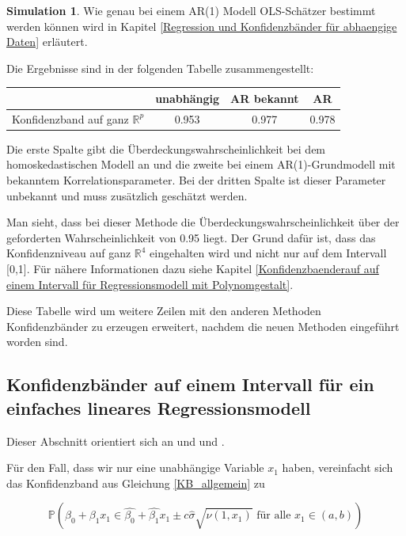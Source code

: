 \documentclass[12pt,a4paper]{article}
\theoremstyle{definition}
\theoremstyle{definition}
\theoremstyle{definition}
\newtheorem{Simulation}[Definition]{Simulation}
\theoremstyle{definition}
\newcommand{\UeberRR}{0.953}
\newcommand{\UeberARbekanntR}{0.977}
\newcommand{\UeberARR}{0.978}
\begin{document}
\begin{Simulation}
Wie genau bei einem AR(1) Modell OLS-Schätzer bestimmt werden können wird in Kapitel \ref{Regression und Konfidenzbänder für abhaengige Daten} erläutert.

Die Ergebnisse sind in der folgenden Tabelle zusammengestellt:

\begin{center}
\begin{tabular}{|c|c|c|c|}
\hline 
 & unabhängig & AR bekannt & AR \\ 
\hline 
Konfidenzband auf ganz $\mathbb{R}^{p}$		 & \UeberRR		  & \UeberARbekanntR & \UeberARR \\ 
\hline 
\end{tabular} 
\end{center}

Die erste Spalte gibt die Überdeckungswahrscheinlichkeit bei dem homoskedastischen Modell an und die zweite bei einem AR(1)-Grundmodell mit bekanntem Korrelationsparameter. Bei der dritten Spalte ist dieser Parameter unbekannt und muss zusätzlich geschätzt werden. 

Man sieht, dass bei dieser Methode die Überdeckungswahrscheinlichkeit über der geforderten Wahrscheinlichkeit von 0.95 liegt. Der Grund dafür ist, dass das Konfidenzniveau auf ganz $\mathbb{R}^{4}$ eingehalten wird und nicht nur auf dem Intervall [0,1]. Für nähere Informationen dazu siehe Kapitel \ref{Konfidenzbaenderauf auf einem Intervall für Regressionsmodell mit Polynomgestalt}.

Diese Tabelle wird um weitere Zeilen mit den anderen Methoden Konfidenzbänder zu erzeugen erweitert, nachdem die neuen Methoden eingeführt worden sind.

\end{Simulation}



\subsection{Konfidenzbänder auf einem Intervall für ein einfaches lineares Regressionsmodell}
\label{Konfidenzbänder auf einem Intervall für ein einfaches lineares Regressionsmodell}
Dieser Abschnitt orientiert sich an \cite[17-23]{Liu64} und \cite{Liu08} und \cite{Wynn71}.

Für den Fall, dass wir nur eine unabhängige Variable $x_1$ haben, vereinfacht sich das Konfidenzband aus Gleichung \eqref{KB_allgemein} zu

\begin{equation}\label{simple_KB}
\mathbb{P} \left( \beta_0 + \beta_1 x_1 \in \hat{\beta_0} + \hat{\beta_1} x_1 \pm c \hat{\sigma} \sqrt{\nu(1,x_1)}  \text{ für alle } x_1 \in (a,b) \right)
\end{equation}
\end{document}
